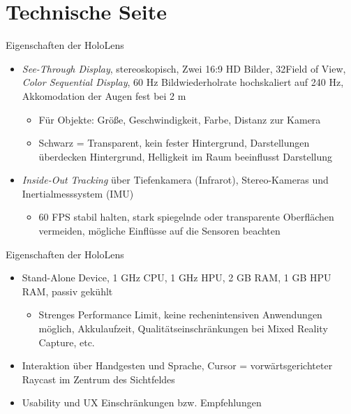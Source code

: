 \part{Technische Seite}
\label{part:tech}

\begin{frame}[fragile]{Eigenschaften der HoloLens}
\begin{itemize}
	\item \textit{See-Through Display}, stereoskopisch, Zwei 16:9 HD Bilder, 32\degree Field of View, \textit{Color Sequential Display}, 60 Hz Bildwiederholrate hochskaliert auf 240 Hz, Akkomodation der Augen fest bei 2 m
	\pause
	\begin{itemize}
		\item Für Objekte: Größe, Geschwindigkeit, Farbe, Distanz zur Kamera
		\pause
		\item Schwarz = Transparent, kein fester Hintergrund, Darstellungen überdecken Hintergrund, Helligkeit im Raum beeinflusst Darstellung
	\end{itemize}
	\pause
	\item \textit{Inside-Out Tracking} über Tiefenkamera (Infrarot), Stereo-Kameras und Inertialmesssystem (IMU)
	\begin{itemize}
		\pause
		\item 60 FPS stabil halten, stark spiegelnde oder transparente Oberflächen vermeiden, mögliche Einflüsse auf die Sensoren beachten
	\end{itemize}
\end{itemize}
\end{frame}

\begin{frame}[fragile]{Eigenschaften der HoloLens}
\begin{itemize}
	\item Stand-Alone Device, 1 GHz CPU, 1 GHz HPU, 2 GB RAM, 1 GB HPU RAM, passiv gekühlt
	\begin{itemize}
		\pause
		\item Strenges Performance Limit, keine rechenintensiven Anwendungen möglich, Akkulaufzeit, Qualitätseinschränkungen bei Mixed Reality Capture, etc.
	\end{itemize}
	\pause
	\item Interaktion über Handgesten und Sprache, Cursor = vorwärtsgerichteter Raycast im Zentrum des Sichtfeldes
	\item Usability und UX Einschränkungen bzw. Empfehlungen
\end{itemize}
\end{frame}


